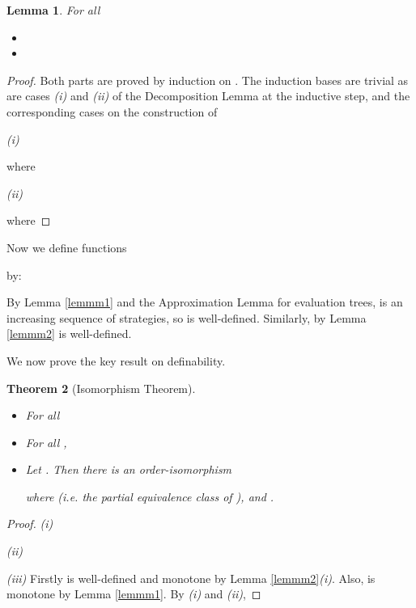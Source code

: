 \documentclass[11pt]{article}
\newtheorem{theorem}{Theorem}[section]
\newtheorem{lemma}[theorem]{Lemma}
\begin{document}
\begin{lemma}\label{lemmm3}
For all 
\begin{itemize}
\item[(i)] 
\item[(ii)] 
\end{itemize}
\end{lemma}
\begin{proof} Both parts are proved by induction on . The
induction bases are trivial as are cases {\it (i)} and {\it (ii)}
of the Decomposition Lemma at the inductive step, and the
corresponding cases on the construction of 

{\it (i)}


where




{\it (ii)}

where



\end{proof}

Now we define functions



by:


By Lemma \ref{lemmm1} and the Approximation Lemma for evaluation trees,
 is an
increasing sequence of strategies, so  is
well-defined. Similarly, by Lemma \ref{lemmm2}  is well-defined.

We now prove the key result on definability.
\begin{theorem}[Isomorphism Theorem]\label{isotheo}

\begin{itemize}
\item[(i)] For all 

\item[(ii)] For all ,

\item[(iii)] Let . Then there is an
  order-isomorphism

where  (i.e. the partial
equivalence class of ), and .
\end{itemize}
\end{theorem}
\begin{proof}

{\it (i)}



{\it (ii)}



{\it (iii)} Firstly  is well-defined and monotone by
Lemma \ref{lemmm2}{\it (i)}. Also,  is monotone by
Lemma \ref{lemmm1}. By {\it (i)} and {\it (ii)}, 
\end{proof}
\end{document}
